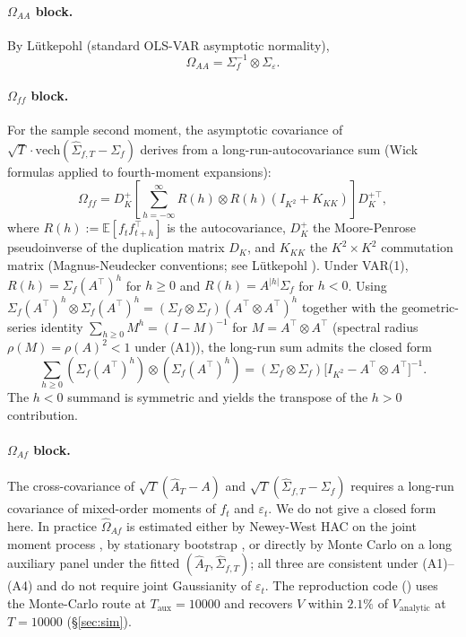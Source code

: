 \documentclass[11pt,letterpaper]{article}
\theoremstyle{remark}
\newcommand{\Sigmaf}{\Sigma_f}
\newcommand{\Sigmae}{\Sigma_\varepsilon}
\newcommand{\Ehat}{\widehat{A}}
\newcommand{\vech}{\mathrm{vech}}
\newcommand{\E}{\mathbb{E}}
\begin{document}
\paragraph{$\Omega_{AA}$ block.} By Lütkepohl \cite[Proposition~3.1, p.~74]{Lutkepohl2005} (standard OLS-VAR asymptotic normality),
\begin{equation*}
\Omega_{AA} = \Sigmaf^{-1} \otimes \Sigmae.
\end{equation*}

\paragraph{$\Omega_{ff}$ block.} For the sample second moment, the asymptotic covariance of $\sqrt{T} \cdot \vech(\widehat{\Sigma}_{f, T} - \Sigmaf)$ derives from a long-run-autocovariance sum (Wick formulas applied to fourth-moment expansions):
\begin{equation*}
\Omega_{ff} = D_K^+ \!\left[\sum_{h = -\infty}^\infty R(h) \otimes R(h) (I_{K^2} + K_{KK})\right] D_K^{+\top},
\end{equation*}
where $R(h) := \E[f_t f_{t+h}^\top]$ is the autocovariance, $D_K^+$ the Moore-Penrose pseudoinverse of the duplication matrix $D_K$, and $K_{KK}$ the $K^2 \times K^2$ commutation matrix (Magnus-Neudecker conventions; see L\"utkepohl \cite[Appendix~A.12]{Lutkepohl2005}). Under VAR(1), $R(h) = \Sigmaf (A^\top)^h$ for $h \ge 0$ and $R(h) = A^{|h|} \Sigmaf$ for $h < 0$. Using $\Sigmaf (A^\top)^h \otimes \Sigmaf (A^\top)^h = (\Sigmaf \otimes \Sigmaf)(A^\top \otimes A^\top)^h$ together with the geometric-series identity $\sum_{h \ge 0} M^h = (I - M)^{-1}$ for $M = A^\top \otimes A^\top$ (spectral radius $\rho(M) = \rho(A)^2 < 1$ under (A1)), the long-run sum admits the closed form
\begin{equation*}
\sum_{h \ge 0} (\Sigmaf (A^\top)^h) \otimes (\Sigmaf (A^\top)^h) = (\Sigmaf \otimes \Sigmaf) \big[I_{K^2} - A^\top \otimes A^\top\big]^{-1}.
\end{equation*}
The $h < 0$ summand is symmetric and yields the transpose of the $h > 0$ contribution.

\paragraph{$\Omega_{Af}$ block.} The cross-covariance of $\sqrt{T}(\Ehat_T - A)$ and $\sqrt{T}(\widehat{\Sigma}_{f, T} - \Sigmaf)$ requires a long-run covariance of mixed-order moments of $f_t$ and $\varepsilon_t$. We do not give a closed form here. In practice $\widehat{\Omega}_{Af}$ is estimated either by Newey-West HAC on the joint moment process \cite{NeweyWest1987}, by stationary bootstrap \cite{PolitisRomano1994}, or directly by Monte Carlo on a long auxiliary panel under the fitted $(\Ehat_T, \widehat{\Sigma}_{f, T})$; all three are consistent under (A1)--(A4) and do not require joint Gaussianity of $\varepsilon_t$. The reproduction code () uses the Monte-Carlo route at $T_{\mathrm{aux}} = 10000$ and recovers $V$ within $2.1\%$ of $V_{\mathrm{analytic}}$ at $T = 10000$ (\S\ref{sec:sim}).
\end{document}
